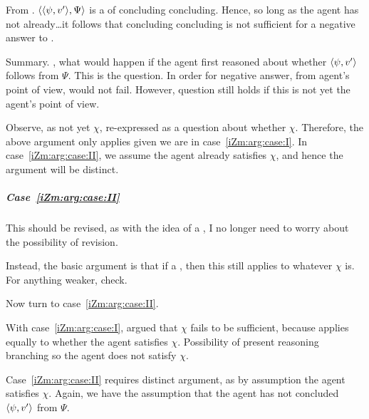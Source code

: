 \begin{note}
  From \iZSm{}.
  \(\langle \langle \psi, v' \rangle, \Psi \rangle\) is a \requ{} of concluding concluding.
  Hence, so long as the agent has not already\dots it follows that concluding concluding is not sufficient for a negative answer to \qzS{}.
\end{note}

\begin{note}[Summary]
  Summary.
  \qzS{}, what would happen if the agent first reasoned about whether \(\langle \psi, v' \rangle\) follows from \(\Psi\).
  This is the question.
  In order for negative answer, from agent's point of view, would not fail.
  However, question still holds if this is not yet the agent's point of view.
\end{note}

\begin{note}[Observation]
  Observe, as not yet \(\chi\), re-expressed \qzS{} as a question about whether \(\chi\).
  Therefore, the above argument only applies given we are in case~\ref{iZm:arg:case:I}.
  In case~\ref{iZm:arg:case:II}, we assume the agent already satisfies \(\chi\), and hence the argument will be distinct.
\end{note}

\subparagraph*{Case~\ref{iZm:arg:case:II}}

\begin{note}
  {
    \color{red}
    This should be revised, as with the idea of a , I no longer need to worry about the possibility of revision.

    Instead, the basic argument is that if a , then this still applies to whatever \(\chi\) is.
    For anything weaker, check.
  }
\end{note}

\begin{note}
  Now turn to case~\ref{iZm:arg:case:II}.

  With case~\ref{iZm:arg:case:I}, argued that \(\chi\) fails to be sufficient, because \qzS{} applies equally to whether the agent satisfies \(\chi\).
  Possibility of present reasoning branching so the agent does not satisfy \(\chi\).

  Case~\ref{iZm:arg:case:II} requires distinct argument, as by assumption the agent satisfies \(\chi\).
  Again, we have the assumption that the agent has not concluded \(\langle \psi, v' \rangle\) from \(\Psi\).
\end{note}

